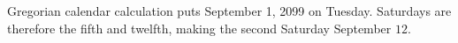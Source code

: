 Gregorian calendar calculation puts September 1, 2099 on Tuesday. Saturdays are therefore the fifth and twelfth, making the second Saturday September $\boxed{12}$.
